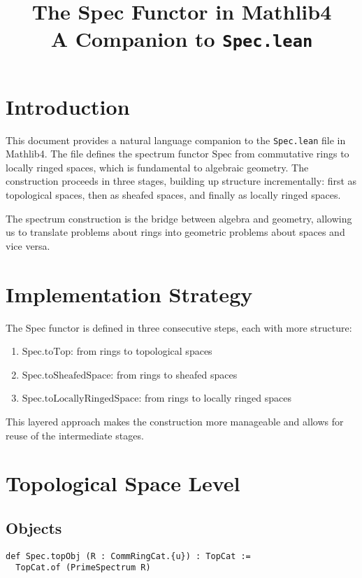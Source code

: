 \documentclass{article}
\title{The Spec Functor in Mathlib4\\
\large A Companion to \texttt{Spec.lean}}
\author{}
\date{}
\theoremstyle{definition}
\begin{document}
\maketitle

\section{Introduction}

This document provides a natural language companion to the \texttt{Spec.lean} file in Mathlib4. The file defines the spectrum functor $\mathrm{Spec}$ from commutative rings to locally ringed spaces, which is fundamental to algebraic geometry. The construction proceeds in three stages, building up structure incrementally: first as topological spaces, then as sheafed spaces, and finally as locally ringed spaces.

The spectrum construction is the bridge between algebra and geometry, allowing us to translate problems about rings into geometric problems about spaces and vice versa.

\section{Implementation Strategy}

The Spec functor is defined in three consecutive steps, each with more structure:

\begin{enumerate}
\item $\mathrm{Spec.toTop}$: from rings to topological spaces
\item $\mathrm{Spec.toSheafedSpace}$: from rings to sheafed spaces
\item $\mathrm{Spec.toLocallyRingedSpace}$: from rings to locally ringed spaces
\end{enumerate}

This layered approach makes the construction more manageable and allows for reuse of the intermediate stages.

\section{Topological Space Level}

\subsection{Objects}

\begin{lstlisting}
def Spec.topObj (R : CommRingCat.{u}) : TopCat :=
  TopCat.of (PrimeSpectrum R)
\end{lstlisting}
\end{document}
